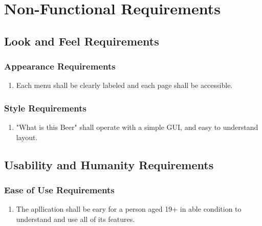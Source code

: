 \documentclass[]{article}
\begin{document}
\section{Non-Functional Requirements}
\label{sec:non-functional_requirements}
\subsection{Look and Feel Requirements}
\label{sub:look_and_feel_requirements}

\subsubsection{Appearance Requirements}
\label{ssub:appearance_requirements}
\begin{enumerate}[{LF}1. ]
	\item Each menu shall be clearly labeled and each page shall be accessible.
\end{enumerate}

\subsubsection{Style Requirements}
\label{ssub:style_requirements}
\begin{enumerate}[{LF}1. ]
	\item "What is this Beer" shall operate with a simple GUI, and easy to understand layout.
\end{enumerate}


\subsection{Usability and Humanity Requirements}
\label{sub:usability_and_humanity_requirements}

\subsubsection{Ease of Use Requirements}
\label{ssub:ease_of_use_requirements}
\begin{enumerate}[{UH}1. ]
	\item The apllication shall be eary for a person aged 19+ in able condition to understand and use all of its features.
\end{enumerate}
\end{document}
